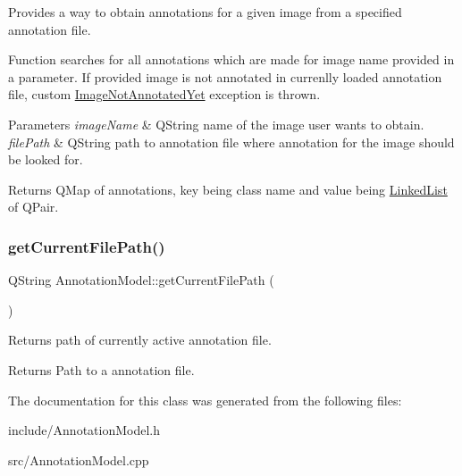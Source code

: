 Provides a way to obtain annotations for a given image from a specified annotation file. 

Function searches for all annotations which are made for image name provided in a parameter. If provided image is not annotated in currenlly loaded annotation file, custom \hyperlink{classImageNotAnnotatedYet}{Image\+Not\+Annotated\+Yet} exception is thrown.


\begin{DoxyParams}{Parameters}
{\em image\+Name} & Q\+String name of the image user wants to obtain. \\
\hline
{\em file\+Path} & Q\+String path to annotation file where annotation for the image should be looked for. \\
\hline
\end{DoxyParams}
\begin{DoxyReturn}{Returns}
Q\+Map of annotations, key being class name and value being \hyperlink{classLinkedList}{Linked\+List} of Q\+Pair. 
\end{DoxyReturn}
\mbox{\label{classAnnotationModel_a704170b9d4cc9e6b62e0bc22d17f6e17}} 
\subsubsection{\texorpdfstring{get\+Current\+File\+Path()}{getCurrentFilePath()}}
{\footnotesize\ttfamily Q\+String Annotation\+Model\+::get\+Current\+File\+Path (\begin{DoxyParamCaption}{ }\end{DoxyParamCaption})}



Returns path of currently active annotation file. 

\begin{DoxyReturn}{Returns}
Path to a annotation file. 
\end{DoxyReturn}


The documentation for this class was generated from the following files\+:\begin{DoxyCompactItemize}
\item 
include/Annotation\+Model.\+h\item 
src/Annotation\+Model.\+cpp\end{DoxyCompactItemize}
